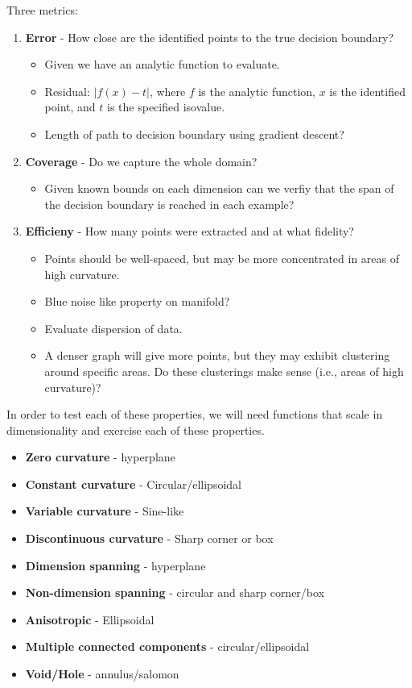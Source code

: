 \documentclass[12pt]{article}
\begin{document}
Three metrics:
\begin{enumerate}
	\item \textbf{Error} - How close are the identified points to the true
	decision boundary? 
	\begin{itemize}
		\item Given we have an analytic function to evaluate.
		\item Residual: $|f(x)-t|$, where $f$ is the analytic function, $x$ is
		the identified point, and $t$ is the specified isovalue.
		\item Length of path to decision boundary using gradient descent?
	\end{itemize}
	\item \textbf{Coverage} - Do we capture the whole domain?
	\begin{itemize}
		\item Given known bounds on each dimension can we verfiy that the span
		of the decision boundary is reached in each example?
	\end{itemize}
	\item \textbf{Efficieny} - How many points were extracted and at what
	fidelity?
	\begin{itemize}
		\item Points should be well-spaced, but may be more concentrated in
		areas of high curvature.
		\item Blue noise like property on manifold?
		\item Evaluate dispersion of data.
		\item A denser graph will give more points, but they may exhibit clustering around specific areas. Do these clusterings make sense (i.e., areas of high curvature)?
	\end{itemize}
\end{enumerate}

In order to test each of these properties, we will need functions that scale in dimensionality and exercise each of these properties.

\begin{itemize}
	\item \textbf{Zero curvature} - hyperplane 
	\item \textbf{Constant curvature} - Circular/ellipsoidal
	\item \textbf{Variable curvature} - Sine-like
	\item \textbf{Discontinuous curvature} - Sharp corner or box
\end{itemize}

\begin{itemize}
	\item \textbf{Dimension spanning} - hyperplane
	\item \textbf{Non-dimension spanning} - circular and sharp corner/box
	\item \textbf{Anisotropic} - Ellipsoidal
	\item \textbf{Multiple connected components} - circular/ellipsoidal
	\item \textbf{Void/Hole} - annulus/salomon
\end{itemize}



\end{document}
